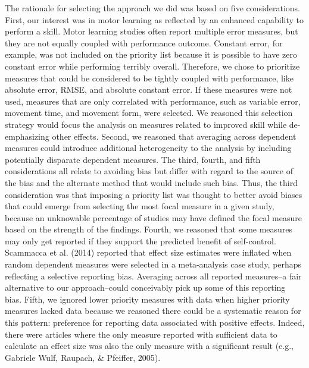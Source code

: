 \documentclass[
  english,
  man,floatsintext]{apa7}
\begin{document}
The rationale for selecting the approach we did was based on five considerations. First, our interest was in motor learning as reflected by an enhanced capability to perform a skill. Motor learning studies often report multiple error measures, but they are not equally coupled with performance outcome. Constant error, for example, was not included on the priority list because it is possible to have zero constant error while performing terribly overall. Therefore, we chose to prioritize measures that could be considered to be tightly coupled with performance, like absolute error, RMSE, and absolute constant error. If these measures were not used, measures that are only correlated with performance, such as variable error, movement time, and movement form, were selected. We reasoned this selection strategy would focus the analysis on measures related to improved skill while de-emphasizing other effects. Second, we reasoned that averaging across dependent measures could introduce additional heterogeneity to the analysis by including potentially disparate dependent measures. The third, fourth, and fifth considerations all relate to avoiding bias but differ with regard to the source of the bias and the alternate method that would include such bias. Thus, the third consideration was that imposing a priority list was thought to better avoid biases that could emerge from selecting the most focal measure in a given study, because an unknowable percentage of studies may have defined the focal measure based on the strength of the findings. Fourth, we reasoned that some measures may only get reported if they support the predicted benefit of self-control. Scammacca et al. (2014) reported that effect size estimates were inflated when random dependent measures were selected in a meta-analysis case study, perhaps reflecting a selective reporting bias. Averaging across all reported measures--a fair alternative to our approach--could conceivably pick up some of this reporting bias. Fifth, we ignored lower priority measures with data when higher priority measures lacked data because we reasoned there could be a systematic reason for this pattern: preference for reporting data associated with positive effects. Indeed, there were articles where the only measure reported with sufficient data to calculate an effect size was also the only measure with a significant result (e.g., Gabriele Wulf, Raupach, \& Pfeiffer, 2005).

\begingroup\fontsize{10}{12}\selectfont
\end{document}
